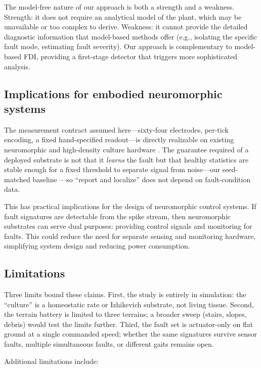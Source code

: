 The model-free nature of our approach is both a strength and a weakness.
Strength: it does not require an analytical model of the plant, which may be
unavailable or too complex to derive. Weakness: it cannot provide the detailed
diagnostic information that model-based methods offer (e.g., isolating the
specific fault mode, estimating fault severity). Our approach is complementary
to model-based FDI, providing a first-stage detector that triggers more
sophisticated analysis.

\subsection{Implications for embodied neuromorphic systems}

The measurement contract assumed here---sixty-four electrodes, per-tick
encoding, a fixed hand-specified readout---is directly realizable on existing
neuromorphic and high-density culture hardware \cite{merolla2014,
davies2018loihi, cai2023brainoware}. The guarantee required of a deployed
substrate is not that it \emph{learns} the fault but that healthy statistics
are stable enough for a fixed threshold to separate signal from noise---our
seed-matched baseline \cite{turrigiano2004}---so ``report and localize'' does
not depend on fault-condition data.

This has practical implications for the design of neuromorphic control systems.
If fault signatures are detectable from the spike stream, then neuromorphic
substrates can serve dual purposes: providing control signals and monitoring
for faults. This could reduce the need for separate sensing and monitoring
hardware, simplifying system design and reducing power consumption.

\subsection{Limitations}

Three limits bound these claims. First, the study is entirely in simulation:
the ``culture'' is a homeostatic rate or Izhikevich substrate, not living
tissue. Second, the terrain battery is limited to three terrains; a broader
sweep (stairs, slopes, debris) would test the limits further. Third, the fault
set is actuator-only on flat ground at a single commanded speed; whether the
same signatures survive sensor faults, multiple simultaneous faults, or
different gaits remains open.

Additional limitations include:

